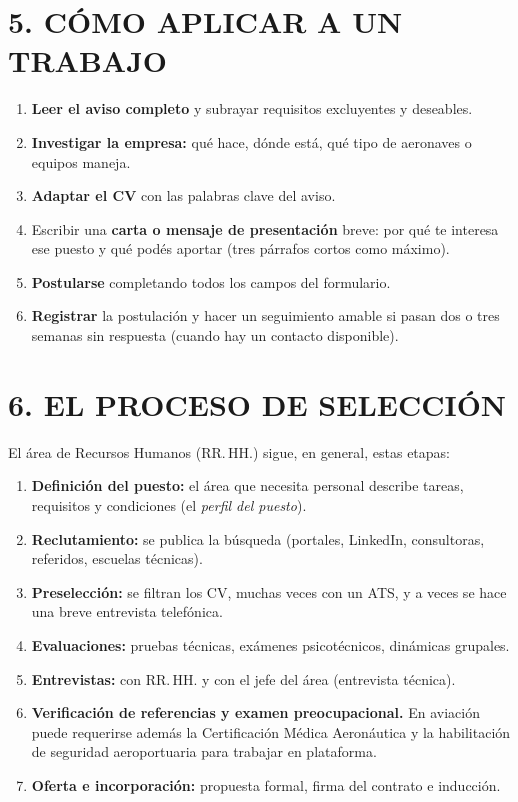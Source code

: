 \section*{5. CÓMO APLICAR A UN TRABAJO}

\begin{enumerate}
  \item \textbf{Leer el aviso completo} y subrayar requisitos excluyentes y deseables.
  \item \textbf{Investigar la empresa:} qué hace, dónde está, qué tipo de aeronaves o equipos
        maneja.
  \item \textbf{Adaptar el CV} con las palabras clave del aviso.
  \item Escribir una \textbf{carta o mensaje de presentación} breve: por qué te interesa ese
        puesto y qué podés aportar (tres párrafos cortos como máximo).
  \item \textbf{Postularse} completando todos los campos del formulario.
  \item \textbf{Registrar} la postulación y hacer un seguimiento amable si pasan dos o tres
        semanas sin respuesta (cuando hay un contacto disponible).
\end{enumerate}

\section*{6. EL PROCESO DE SELECCIÓN}

El área de Recursos Humanos (RR.\,HH.) sigue, en general, estas etapas:

\begin{enumerate}
  \item \textbf{Definición del puesto:} el área que necesita personal describe tareas,
        requisitos y condiciones (el \textit{perfil del puesto}).
  \item \textbf{Reclutamiento:} se publica la búsqueda (portales, LinkedIn, consultoras,
        referidos, escuelas técnicas).
  \item \textbf{Preselección:} se filtran los CV, muchas veces con un ATS, y a veces se hace
        una breve entrevista telefónica.
  \item \textbf{Evaluaciones:} pruebas técnicas, exámenes psicotécnicos, dinámicas grupales.
  \item \textbf{Entrevistas:} con RR.\,HH. y con el jefe del área (entrevista técnica).
  \item \textbf{Verificación de referencias y examen preocupacional.} En aviación puede
        requerirse además la Certificación Médica Aeronáutica y la habilitación de seguridad
        aeroportuaria para trabajar en plataforma.
  \item \textbf{Oferta e incorporación:} propuesta formal, firma del contrato e inducción.
\end{enumerate}


